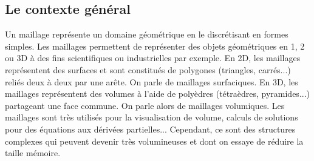 

\subsection*{Le contexte général}
\noindent
Un maillage représente un domaine géométrique en le discrétisant en formes simples. Les maillages permettent de représenter des objets géométriques en 1, 2 ou 3D à des fins scientifiques ou industrielles par exemple. En 2D, les maillages représentent des surfaces et sont constitués de polygones (triangles, carrés...) reliés deux à deux par une arête. On parle de maillages surfaciques. En 3D, les maillages représentent des volumes à l'aide de polyèdres (tétraèdres, pyramides...) partageant une face commune. On parle alors de maillages volumiques. Les maillages sont très utilisés pour la visualisation de volume, calculs de solutions pour des équations aux dérivées partielles... Cependant, ce sont des structures complexes qui peuvent devenir très volumineuses et dont on essaye de réduire la taille mémoire.

